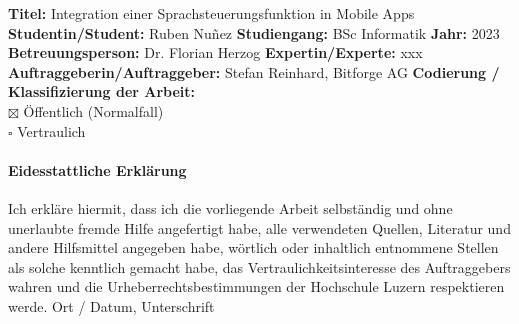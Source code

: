 \documentclass[main.tex]{subfiles} %
\begin{document}
\vspace*{0.6cm}

\noindent
\textbf{Titel:} Integration einer Sprachsteuerungsfunktion in Mobile Apps \newline \newline
\textbf{Studentin/Student:} Ruben Nuñez \newline \newline
\textbf{Studiengang:} BSc Informatik \newline \newline
\textbf{Jahr:} 2023 \newline \newline
\textbf{Betreuungsperson:} Dr. Florian Herzog \newline \newline
\textbf{Expertin/Experte:} xxx \newline \newline
\textbf{Auftraggeberin/Auftraggeber:} Stefan Reinhard, Bitforge AG \newline \newline
\textbf{Codierung / Klassifizierung der Arbeit:} \\
$\boxtimes$ Öffentlich (Normalfall) \\
$\square$ Vertraulich \\




\paragraph{\textbf{Eidesstattliche Erklärung}}
Ich erkläre hiermit, dass ich die vorliegende Arbeit selbständig und ohne unerlaubte fremde
Hilfe angefertigt habe, alle verwendeten Quellen, Literatur und andere Hilfsmittel angegeben
habe, wörtlich oder inhaltlich entnommene Stellen als solche kenntlich gemacht habe, das
Vertraulichkeitsinteresse des Auftraggebers wahren und die Urheberrechtsbestimmungen der
Hochschule Luzern respektieren werde.
\newline
\newline
Ort / Datum, Unterschrift	\underline{\hspace*{4cm}}
\newline
\newline
\end{document}
